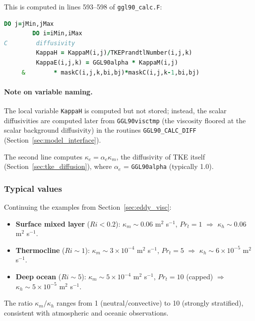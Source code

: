 \documentclass[12pt,letterpaper]{article}
\begin{document}
This is computed in lines 593--598 of \verb|ggl90_calc.F|:

\begin{lstlisting}[language=Fortran,caption={(ggl90\_calc.F:L593--598) Eddy diffusivity and TKE diffusivity}]
       DO j=jMin,jMax
        DO i=iMin,iMax
C        diffusivity
         KappaH = KappaM(i,j)/TKEPrandtlNumber(i,j,k)
         KappaE(i,j,k) = GGL90alpha * KappaM(i,j)
     &        * maskC(i,j,k,bi,bj)*maskC(i,j,k-1,bi,bj)
\end{lstlisting}

\paragraph{Note on variable naming.} The local variable \verb|KappaH| is computed but not stored; instead, the scalar diffusivities are computed later from \verb|GGL90visctmp| (the viscosity floored at the scalar background diffusivity) in the routines \verb|GGL90_CALC_DIFF| (Section~\ref{sec:model_interface}).

The second line computes $\kappa_e = \alpha_e \kappa_m$, the diffusivity of TKE itself (Section~\ref{sec:tke_diffusion}), where $\alpha_e$ = \verb|GGL90alpha| (typically 1.0).

\subsubsection{Typical values}

Continuing the examples from Section~\ref{sec:eddy_visc}:
\begin{itemize}
\item \textbf{Surface mixed layer} ($Ri < 0.2$): $\kappa_m \sim 0.06$ m$^2$ s$^{-1}$, $Pr_t = 1$ $\Rightarrow$ $\kappa_h \sim 0.06$ m$^2$ s$^{-1}$.
\item \textbf{Thermocline} ($Ri \sim 1$): $\kappa_m \sim 3 \times 10^{-4}$ m$^2$ s$^{-1}$, $Pr_t = 5$ $\Rightarrow$ $\kappa_h \sim 6 \times 10^{-5}$ m$^2$ s$^{-1}$.
\item \textbf{Deep ocean} ($Ri \sim 5$): $\kappa_m \sim 5 \times 10^{-4}$ m$^2$ s$^{-1}$, $Pr_t = 10$ (capped) $\Rightarrow$ $\kappa_h \sim 5 \times 10^{-5}$ m$^2$ s$^{-1}$.
\end{itemize}

The ratio $\kappa_m / \kappa_h$ ranges from 1 (neutral/convective) to 10 (strongly stratified), consistent with atmospheric and oceanic observations.

\end{document}
